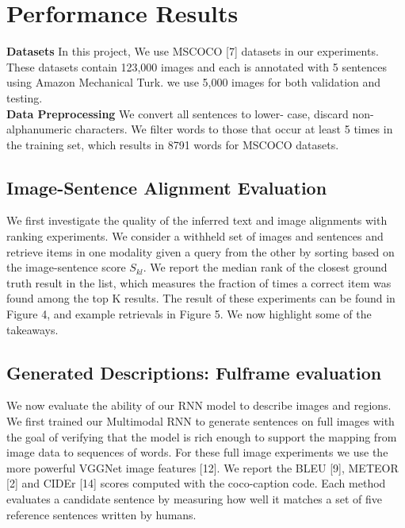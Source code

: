 \documentclass[12pt]{article}%
\begin{document}
\section{Performance Results}

{\bf Datasets} In this project, We use 
MSCOCO [7] datasets in our experiments. These datasets
contain 123,000 images 
and each is annotated with 5 sentences using Amazon
Mechanical Turk.  we
use 5,000 images for both validation and testing.\\
{\bf Data Preprocessing} We convert all sentences to lower- case, discard non-alphanumeric characters. We filter words to those that occur at least 5 times in the training set, which results in  8791 words for MSCOCO datasets.


\subsection{Image-Sentence Alignment Evaluation}

We first investigate the quality of the inferred text and image alignments with ranking experiments. We consider a withheld set of images and sentences and retrieve items in one modality given a query from the other by sorting based on the image-sentence score $S_{kl}$. We report the median rank of the closest ground truth result in the list, which measures the fraction of times a correct item was found among the top K results. The result of these experiments can be found in Figure 4, and example retrievals in Figure 5. We now highlight some of the takeaways.





\subsection{Generated Descriptions: Fulframe evaluation}

We now evaluate the ability of our RNN model to describe images and regions. We first trained our Multimodal RNN to generate sentences on full images with the goal of verifying that the model is rich enough to support the mapping from image data to sequences of words. For these full image experiments we use the more powerful VGGNet image features [12]. We report the BLEU [9], METEOR [2] and CIDEr  [14]  scores  computed  with  the coco-caption
code.  Each method evaluates a candidate sentence
by measuring how well it matches a set of five reference
sentences written by humans.
\end{document}
